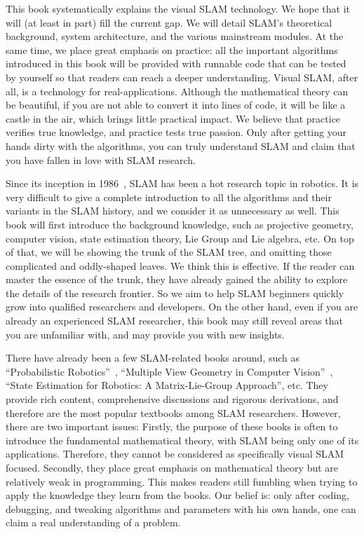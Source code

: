 This book systematically explains the visual SLAM technology. We hope that it will (at least in part) fill the current gap. We will detail SLAM's theoretical background, system architecture, and the various mainstream modules. At the same time, we place great emphasis on practice: all the important algorithms introduced in this book will be provided with runnable code that can be tested by yourself so that readers can reach a deeper understanding. Visual SLAM, after all, is a technology for real-applications. Although the mathematical theory can be beautiful, if you are not able to convert it into lines of code, it will be like a castle in the air, which brings little practical impact. We believe that practice verifies true knowledge, and practice tests true passion. Only after getting your hands dirty with the algorithms, you can truly understand SLAM and claim that you have fallen in love with SLAM research.

Since its inception in 1986~\cite{Smith1986}, SLAM has been a hot research topic in robotics. It is very difficult to give a complete introduction to all the algorithms and their variants in the SLAM history, and we consider it as unnecessary as well. This book will first introduce the background knowledge, such as projective geometry, computer vision, state estimation theory, Lie Group and Lie algebra, etc. On top of that, we will be showing the trunk of the SLAM tree, and omitting those complicated and oddly-shaped leaves. We think this is effective. If the reader can master the essence of the trunk, they have already gained the ability to explore the details of the research frontier. So we aim to help SLAM beginners quickly grow into qualified researchers and developers. On the other hand, even if you are already an experienced SLAM researcher, this book may still reveal areas that you are unfamiliar with, and may provide you with new insights.

There have already been a few SLAM-related books around, such as ``Probabilistic Robotics''~\cite{Thrun2005}, ``Multiple View Geometry in Computer Vision''~\cite{Hartley2003}, ``State Estimation for Robotics: A Matrix-Lie-Group Approach''\cite{Barfoot2016}, etc. They provide rich content, comprehensive discussions and rigorous derivations, and therefore are the most popular textbooks among SLAM researchers. However,  there are two important issues: Firstly, the purpose of these books is often to introduce the fundamental mathematical theory, with SLAM being only one of its applications. Therefore, they cannot be considered as specifically visual SLAM focused. Secondly, they place great emphasis on mathematical theory but are relatively weak in programming. This makes readers still fumbling when trying to apply the knowledge they learn from the books. Our belief is: only after coding, debugging, and tweaking algorithms and parameters with his own hands, one can claim a real understanding of a problem.

